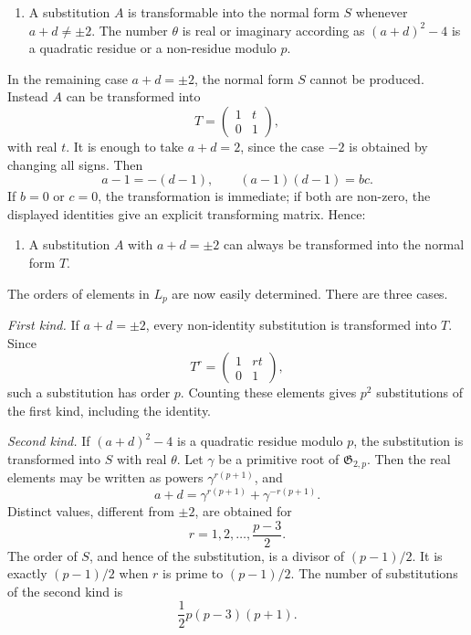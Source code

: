 \documentclass[11pt]{article}
\begin{document}
\begin{enumerate}[label=\arabic*.]
\item A substitution \(A\) is transformable into the normal form \(S\) whenever \(a+d\ne\pm2\).  The number \(\theta\) is real or imaginary according as \((a+d)^2-4\) is a quadratic residue or a non-residue modulo \(p\).
\end{enumerate}

In the remaining case \(a+d=\pm2\), the normal form \(S\) cannot be produced.  Instead \(A\) can be transformed into
\begin{equation}\label{eq:68-6}
 T=\begin{pmatrix}1&t\\0&1\end{pmatrix},
\end{equation}
with real \(t\).  It is enough to take \(a+d=2\), since the case \(-2\) is obtained by changing all signs.  Then
\begin{equation}\label{eq:68-8}
 a-1=-(d-1),
 \qquad (a-1)(d-1)=bc.
\end{equation}
If \(b=0\) or \(c=0\), the transformation is immediate; if both are non-zero, the displayed identities give an explicit transforming matrix.  Hence:

\begin{enumerate}[label=\arabic*.,resume]
\item A substitution \(A\) with \(a+d=\pm2\) can always be transformed into the normal form \(T\).
\end{enumerate}

The orders of elements in \(L_p\) are now easily determined.  There are three cases.

\emph{First kind.}  If \(a+d=\pm2\), every non-identity substitution is transformed into \(T\).  Since
\[
 T^r=\begin{pmatrix}1&rt\\0&1\end{pmatrix},
\]
such a substitution has order \(p\).  Counting these elements gives \(p^2\) substitutions of the first kind, including the identity.

\emph{Second kind.}  If \((a+d)^2-4\) is a quadratic residue modulo \(p\), the substitution is transformed into \(S\) with real \(\theta\).  Let \(\gamma\) be a primitive root of \(\mathfrak G_{2,p}\).  Then the real elements may be written as powers \(\gamma^{r(p+1)}\), and
\begin{equation}\label{eq:68-9}
 a+d=\gamma^{r(p+1)}+\gamma^{-r(p+1)}.
\end{equation}
Distinct values, different from \(\pm2\), are obtained for
\begin{equation}\label{eq:68-10}
 r=1,2,\ldots,\frac{p-3}{2}.
\end{equation}
The order of \(S\), and hence of the substitution, is a divisor of \((p-1)/2\).  It is exactly \((p-1)/2\) when \(r\) is prime to \((p-1)/2\).  The number of substitutions of the second kind is
\begin{equation}\label{eq:68-count2}
 \frac12p(p-3)(p+1).
\end{equation}
\end{document}
